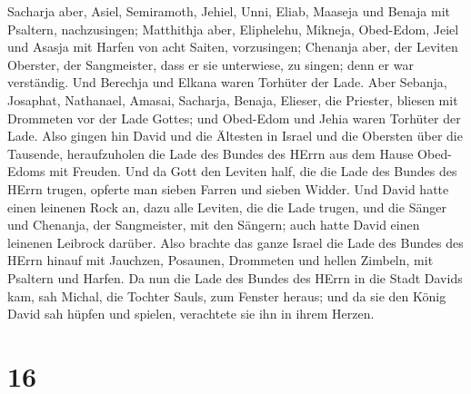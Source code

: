 Sacharja aber, Asiel, Semiramoth, Jehiel, Unni, Eliab, Maaseja und
Benaja mit Psaltern, nachzusingen;  Matthithja aber,
Eliphelehu, Mikneja, Obed-Edom, Jeiel und Asasja mit Harfen von acht
Saiten, vorzusingen;  Chenanja aber, der Leviten
Oberster, der Sangmeister, dass er sie unterwiese, zu singen; denn er
war verständig.  Und Berechja und Elkana waren Torhüter
der Lade.  Aber Sebanja, Josaphat, Nathanael, Amasai,
Sacharja, Benaja, Elieser, die Priester, bliesen mit Drommeten vor der
Lade Gottes; und Obed-Edom und Jehia waren Torhüter der Lade.
 Also gingen hin David und die Ältesten in Israel und die
Obersten über die Tausende, heraufzuholen die Lade des Bundes des HErrn
aus dem Hause Obed-Edoms mit Freuden.  Und da Gott den
Leviten half, die die Lade des Bundes des HErrn trugen, opferte man
sieben Farren und sieben Widder.  Und David hatte einen
leinenen Rock an, dazu alle Leviten, die die Lade trugen, und die Sänger
und Chenanja, der Sangmeister, mit den Sängern; auch hatte David einen
leinenen Leibrock darüber.  Also brachte das ganze Israel
die Lade des Bundes des HErrn hinauf mit Jauchzen, Posaunen, Drommeten
und hellen Zimbeln, mit Psaltern und Harfen.  Da nun die
Lade des Bundes des HErrn in die Stadt Davids kam, sah Michal, die
Tochter Sauls, zum Fenster heraus; und da sie den König David sah hüpfen
und spielen, verachtete sie ihn in ihrem Herzen.

\hypertarget{section-15}{%
\section{16}\label{section-15}}

